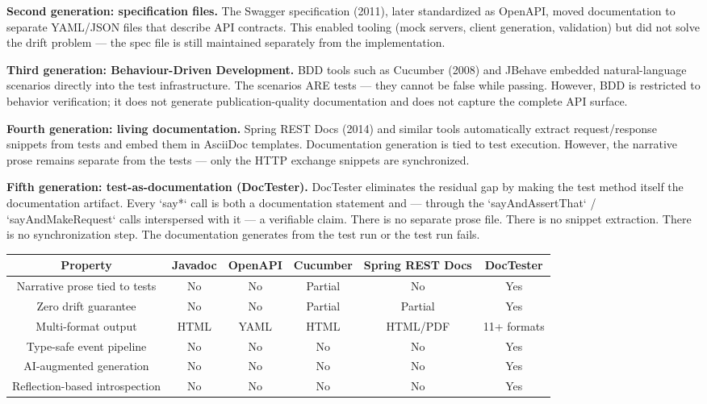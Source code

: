 \documentclass[11pt]{article}
\begin{document}
\textbf{Second generation: specification files.} The Swagger specification (2011), later standardized as OpenAPI, moved documentation to separate YAML/JSON files that describe API contracts. This enabled tooling (mock servers, client generation, validation) but did not solve the drift problem — the spec file is still maintained separately from the implementation.
\cite[p. pp. 203-215]{Richardson2007}

\textbf{Third generation: Behaviour-Driven Development.} BDD tools such as Cucumber (2008) and JBehave embedded natural-language scenarios directly into the test infrastructure. The scenarios ARE tests — they cannot be false while passing. However, BDD is restricted to behavior verification; it does not generate publication-quality documentation and does not capture the complete API surface.
\cite{Freeman2009}

\textbf{Fourth generation: living documentation.} Spring REST Docs (2014) and similar tools automatically extract request/response snippets from tests and embed them in AsciiDoc templates. Documentation generation is tied to test execution. However, the narrative prose remains separate from the tests — only the HTTP exchange snippets are synchronized.
\cite{Humble2010}

\textbf{Fifth generation: test-as-documentation (DocTester).} DocTester eliminates the residual gap by making the test method itself the documentation artifact. Every `say*` call is both a documentation statement and — through the `sayAndAssertThat` / `sayAndMakeRequest` calls interspersed with it — a verifiable claim. There is no separate prose file. There is no snippet extraction. There is no synchronization step. The documentation generates from the test run or the test run fails.

\begin{table}[h]
\centering
\begin{tabular}{|c|c|c|c|c|c|}
\hline
\textbf{Property} & \textbf{Javadoc} & \textbf{OpenAPI} & \textbf{Cucumber} & \textbf{Spring REST Docs} & \textbf{DocTester} \\
\hline
Narrative prose tied to tests & No & No & Partial & No & Yes \\
Zero drift guarantee & No & No & Partial & Partial & Yes \\
Multi-format output & HTML & YAML & HTML & HTML/PDF & 11+ formats \\
Type-safe event pipeline & No & No & No & No & Yes \\
AI-augmented generation & No & No & No & No & Yes \\
Reflection-based introspection & No & No & No & No & Yes \\
\hline
\end{tabular}
\end{table}
\end{document}
